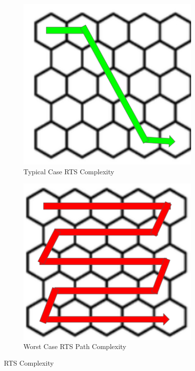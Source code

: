 \begin{figure}[htbp]
  \centering
  \begin{subfigure}[b]{0.48\textwidth}
    \includegraphics[width=\textwidth]{figs/Thomas/Return To Safety/real_case_complexity.png}
    \caption{Typical Case RTS Complexity}
    \label{fig:typical_case}
  \end{subfigure}
  \hfill
  \begin{subfigure}[b]{0.48\textwidth}
    \includegraphics[width=\textwidth]{figs/Thomas/Return To Safety/worst_case_complexity.png}
    \caption{Worst Case RTS Path Complexity}
    \label{fig:worst_case}
\end{subfigure}
\label{fig:rts_complexity}
\caption{RTS Complexity}
\end{figure}